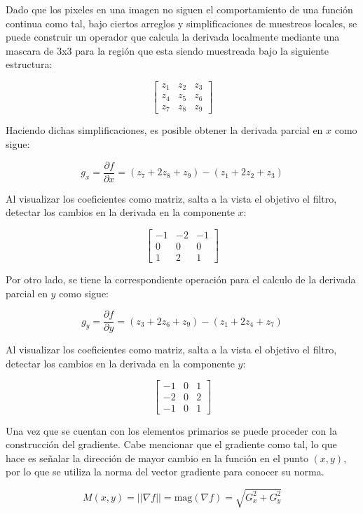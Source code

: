 \documentclass[11pt, letterpaper]{article}
\begin{document}
	Dado que los pixeles en una imagen no siguen el comportamiento de una función continua como tal, bajo ciertos arreglos y simplificaciones de muestreos locales, se puede construir un operador que calcula la derivada localmente mediante una mascara de 3x3 para la región que esta siendo muestreada bajo la siguiente estructura:
	
	$$
	\begin{bmatrix}
		z_1 & z_2 & z_3 \\
		z_4 & z_5 & z_6 \\
		z_7 & z_8 & z_9
	\end{bmatrix}
	$$
	
	Haciendo dichas simplificaciones, es posible obtener la derivada parcial en $x$ como sigue:
	
	$$g_x = \frac{\partial f}{\partial x} = (z_7 + 2z_8 + z_9) - (z_1 + 2z_2 + z_3)$$	
	
	Al visualizar los coeficientes como matriz, salta a la vista el objetivo el filtro, detectar los cambios en la derivada en la componente $x$:
	
	$$
	\begin{bmatrix}
		-1 & -2 & -1 \\
		0 & 0 & 0 \\
		1 & 2 & 1
	\end{bmatrix}
	$$
	
	
	Por otro lado, se tiene la correspondiente operación para el calculo de la derivada parcial en $y$ como sigue:	
	
	$$g_y = \frac{\partial f}{\partial y} = (z_3 + 2z_6 + z_9) - (z_1 + 2z_4 + z_7)$$

	\newpage
	
	Al visualizar los coeficientes como matriz, salta a la vista el objetivo el filtro, detectar los cambios en la derivada en la componente $y$:
	
	$$
	\begin{bmatrix}
		-1 & 0 & 1 \\
		-2 & 0 & 2 \\
		-1 & 0 & 1
	\end{bmatrix}
	$$
	
	Una vez que se cuentan con los elementos primarios se puede proceder con la construcción del gradiente. Cabe mencionar que el gradiente como tal, lo que hace es señalar la dirección de mayor cambio en la función en el punto $(x,y)$, por lo que se utiliza la norma del vector gradiente para conocer su norma.
	
	$$M(x, y) = ||\nabla f|| = \text{mag}(\nabla f) = \sqrt{G_x^2 + G_y^2}$$
	
\end{document}
